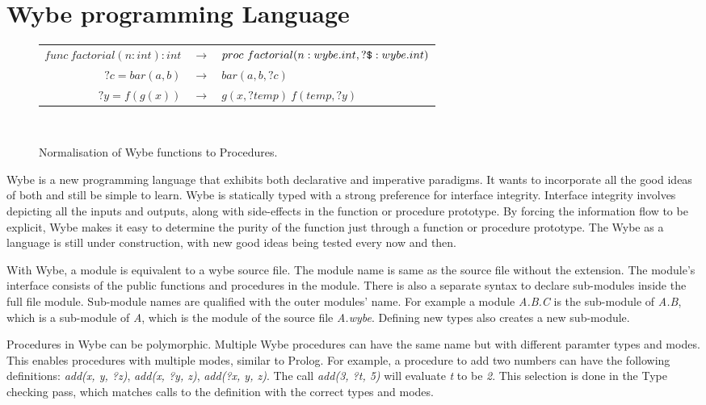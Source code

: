 \chapter{Wybe programming Language}


\begin{figure}
\centering
\begin{tabular}{r c l}

\( func\ factorial(n:int):int \) & \(\rightarrow \) & 
\( proc\ factorial(n:wybe.int, ?\verb+$+:wybe.int) \) \\
\( ?c = bar(a, b) \) & \(\rightarrow\) & \( bar(a, b, ?c) \) \\
\( ?y = f(g(x)) \) & \(\rightarrow\) & \( g(x, ?temp)\ f(temp, ?y) \) \\


\end{tabular}
\\
\caption{Normalisation of Wybe functions to Procedures.}
\label{fig:wybe_convert_to_proc}
\end{figure}


Wybe is a new programming language that exhibits both declarative and
imperative paradigms. It wants to incorporate all the good ideas of both and
still be simple to learn. Wybe is statically typed with a strong preference for
interface integrity. Interface integrity involves depicting all the inputs and
outputs, along with side-effects in the function or procedure prototype. By
forcing the information flow to be explicit, Wybe makes it easy to determine
the purity of the function just through a function or procedure prototype. The
Wybe as a language is still under construction, with new good ideas being
tested every now and then.

With Wybe, a module is equivalent to a wybe source file. The module name is
same as the source file without the extension. The module's interface consists
of the public functions and procedures in the module. There is also a separate
syntax to declare sub-modules inside the full file module. Sub-module names are
qualified with the outer modules' name. For example a module \textit{A.B.C} is
the sub-module of \textit{A.B}, which is a sub-module of \textit{A}, which is
the module of the source file \textit{A.wybe}. Defining new types also creates
a new sub-module.


Procedures in Wybe can be polymorphic. Multiple Wybe procedures can have the
same name but with different paramter types and modes. This enables procedures
with multiple modes, similar to Prolog. For example, a procedure to add two
numbers can have the following definitions: \textit{add(x, y, ?z)},
\textit{add(x, ?y, z)}, \textit{add(?x, y, z)}. The call \textit{add(3, ?t, 5)}
will evaluate \textit{t} to be \textit{2}. This selection is done in the Type
checking pass, which matches calls to the definition with the correct types and
modes.




